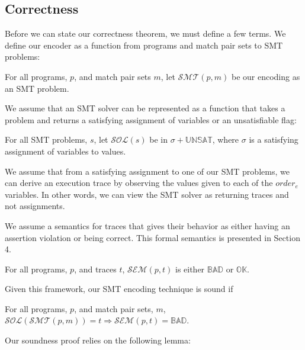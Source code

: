 \subsection{Correctness}

Before we can state our correctness theorem, we must define a few
terms. We define our encoder as a function from programs and match pair sets
to SMT problems:

\begin{definition}[Encoder]
For all programs, $p$, and match pair sets $m$, let $\mathcal{SMT}(p,
m)$ be our encoding as an SMT problem.
\end{definition}

We assume that an SMT solver can be represented as a function that
takes a problem and returns a satisfying assignment of variables or an
unsatisfiable flag:

\begin{definition}
For all SMT problems, $s$, let $\mathcal{SOL}(s)$ be in $\sigma +
\mathbb{UNSAT}$, where $\sigma$ is a satisfying assignment of
variables to values.
\end{definition}

We assume that from a satisfying assignment to one of our SMT
problems, we can derive an execution trace by observing the values
given to each of the $\textit{order}_{e}$ variables. In other words,
we can view the SMT solver as returning traces and not assignments.

We assume a semantics for traces that gives their behavior as either
having an assertion violation or being correct. This formal semantics is presented in Section 4. 

\begin{definition}[Semantics]
For all programs, $p$, and traces $t$, $\mathcal{SEM}(p, t)$ is either
$\mathbb{BAD}$ or $\mathbb{OK}$.
\end{definition}

Given this framework, our SMT encoding technique is sound if

\begin{theorem}[Soundness]
For all programs, $p$, and match pair sets, $m$,
$\mathcal{SOL}(\mathcal{SMT}(p, m)) = t \Rightarrow \mathcal{SEM}(p, t) =
\mathbb{BAD}$.
\end{theorem}

Our soundness proof relies on the following lemma:

